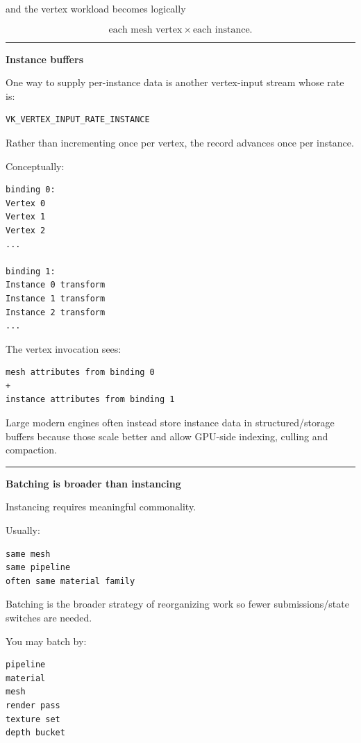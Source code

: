 and the vertex workload becomes logically

\[
\text{each mesh vertex}
\times
\text{each instance}.
\]

\begin{center}\rule{0.5\linewidth}{0.5pt}\end{center}

\textbf{Instance buffers}

One way to supply per-instance data is another vertex-input stream whose rate is:

\begin{verbatim}
VK_VERTEX_INPUT_RATE_INSTANCE
\end{verbatim}

Rather than incrementing once per vertex, the record advances once per instance.

Conceptually:

\begin{verbatim}
binding 0:
Vertex 0
Vertex 1
Vertex 2
...

binding 1:
Instance 0 transform
Instance 1 transform
Instance 2 transform
...
\end{verbatim}

The vertex invocation sees:

\begin{verbatim}
mesh attributes from binding 0
+
instance attributes from binding 1
\end{verbatim}

Large modern engines often instead store instance data in structured/storage buffers because those scale better and allow GPU-side indexing, culling and compaction.

\begin{center}\rule{0.5\linewidth}{0.5pt}\end{center}

\textbf{Batching is broader than instancing}

Instancing requires meaningful commonality.

Usually:

\begin{verbatim}
same mesh
same pipeline
often same material family
\end{verbatim}

Batching is the broader strategy of reorganizing work so fewer submissions/state switches are needed.

You may batch by:

\begin{verbatim}
pipeline
material
mesh
render pass
texture set
depth bucket
\end{verbatim}


